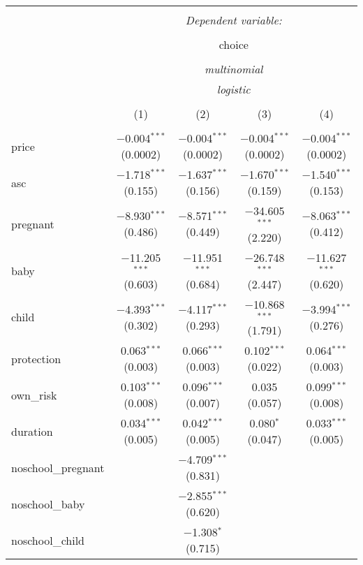 
\begin{table}[!htbp] \centering 
  \caption{} 
  \label{} 
\begin{tabular}{@{\extracolsep{1pt}}lcccc} 
\\[-1.8ex]\hline 
\hline \\[-1.8ex] 
 & \multicolumn{4}{c}{\textit{Dependent variable:}} \\ 
\cline{2-5} 
\\[-1.8ex] & \multicolumn{4}{c}{choice} \\ 
\\[-1.8ex] & \multicolumn{4}{c}{\textit{multinomial}} \\ 
 & \multicolumn{4}{c}{\textit{logistic}} \\ 
\\[-1.8ex] & (1) & (2) & (3) & (4)\\ 
\hline \\[-1.8ex] 
 price & $-$0.004$^{***}$ (0.0002) & $-$0.004$^{***}$ (0.0002) & $-$0.004$^{***}$ (0.0002) & $-$0.004$^{***}$ (0.0002) \\ 
  asc & $-$1.718$^{***}$ (0.155) & $-$1.637$^{***}$ (0.156) & $-$1.670$^{***}$ (0.159) & $-$1.540$^{***}$ (0.153) \\ 
  pregnant & $-$8.930$^{***}$ (0.486) & $-$8.571$^{***}$ (0.449) & $-$34.605$^{***}$ (2.220) & $-$8.063$^{***}$ (0.412) \\ 
  baby & $-$11.205$^{***}$ (0.603) & $-$11.951$^{***}$ (0.684) & $-$26.748$^{***}$ (2.447) & $-$11.627$^{***}$ (0.620) \\ 
  child & $-$4.393$^{***}$ (0.302) & $-$4.117$^{***}$ (0.293) & $-$10.868$^{***}$ (1.791) & $-$3.994$^{***}$ (0.276) \\ 
  protection & 0.063$^{***}$ (0.003) & 0.066$^{***}$ (0.003) & 0.102$^{***}$ (0.022) & 0.064$^{***}$ (0.003) \\ 
  own\_risk & 0.103$^{***}$ (0.008) & 0.096$^{***}$ (0.007) & 0.035 (0.057) & 0.099$^{***}$ (0.008) \\ 
  duration & 0.034$^{***}$ (0.005) & 0.042$^{***}$ (0.005) & 0.080$^{*}$ (0.047) & 0.033$^{***}$ (0.005) \\ 
  noschool\_pregnant &  & $-$4.709$^{***}$ (0.831) &  &  \\ 
  noschool\_baby &  & $-$2.855$^{***}$ (0.620) &  &  \\ 
  noschool\_child &  & $-$1.308$^{*}$ (0.715) &  &  \\ 

\end{tabular}
\end{table}
